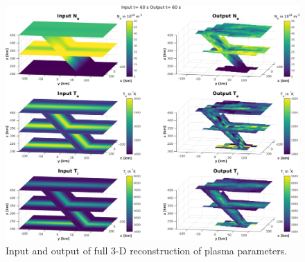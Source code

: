 \documentclass[draft,ras]{agutex}
\begin{document}
\begin{article}
\begin{figure}[!t]
\centering
\includegraphics[width=6in]{60_60}
\caption{Input and output of full 3-D reconstruction of plasma parameters.}
\label{fig:3dparams}
\end{figure}


\end{article}
\end{document}
